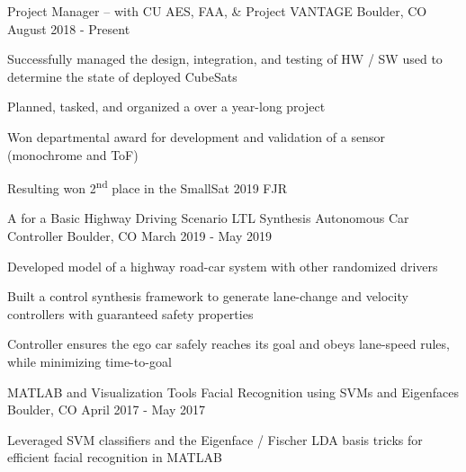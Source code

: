 \begin{cventries}
\cventry
    {Project Manager --  with CU AES, FAA, \& }
    {Project VANTAGE}
    {Boulder, CO}
    {August 2018 - Present}
    {
     \begin{cvitems}
      \item{Successfully managed the design, integration, and testing of HW / SW used to determine the state of deployed CubeSats}
      \item{Planned, tasked, and organized a  over a year-long project}
      \item{Won departmental award for development and validation of a sensor (monochrome and ToF) }
      \item{Resulting
       won 2\textsuperscript{nd} place in the SmallSat 2019 FJR }
     \end{cvitems}
    }
    
  \cventry
  	{A  for a Basic Highway Driving Scenario}
    {LTL Synthesis Autonomous Car Controller}
    {Boulder, CO}
    {March 2019 - May 2019}
    {
      \begin{cvitems}
        \item{Developed model of a highway road-car system with other randomized drivers}
        \item{Built a control synthesis framework to generate lane-change and velocity controllers with guaranteed safety properties}
        \item {Controller ensures the ego car safely reaches its goal and obeys lane-speed rules, while minimizing time-to-goal}
      \end{cvitems}
    }

  \cventry
    {MATLAB  and Visualization Tools}
    {Facial Recognition using SVMs and Eigenfaces}
    {Boulder, CO}
    {April 2017 - May 2017}
    {
      \begin{cvitems}
        \item {Leveraged SVM classifiers and the Eigenface / Fischer LDA basis tricks for efficient facial recognition in MATLAB}
      \end{cvitems}
    }
\end{cventries}
